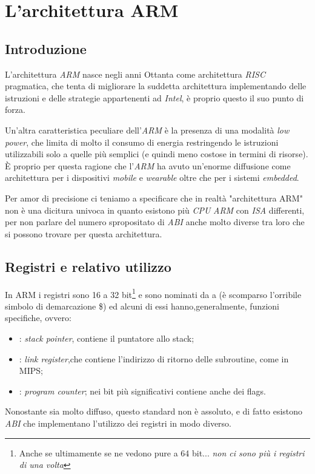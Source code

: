 \documentclass[class=book, crop=false, oneside]{standalone}
\begin{document}
\chapter{L'architettura ARM}

\section{Introduzione}
L'architettura \emph{ARM} nasce negli anni Ottanta come architettura \emph{RISC} pragmatica, che tenta di migliorare la suddetta architettura implementando delle istruzioni e delle strategie appartenenti ad \emph{Intel}, è proprio questo il suo punto di forza.

Un'altra caratteristica peculiare dell'\emph{ARM} è la presenza di una modalità \emph{low power}, che limita di molto il consumo di energia restringendo le istruzioni utilizzabili solo a quelle più semplici (e quindi meno costose in termini di risorse). È proprio per questa ragione che l'\emph{ARM} ha avuto un'enorme diffusione come architettura per i dispositivi \emph{mobile} e \emph{wearable} oltre che per i sistemi \emph{embedded}.

Per amor di precisione ci teniamo a specificare che in realtà "architettura ARM" non è una dicitura univoca in quanto esistono più \emph{CPU} \emph{ARM} con \emph{ISA} differenti, per non parlare del numero spropositato di \emph{ABI} anche molto diverse tra loro che si possono trovare per questa architettura.

\section{Registri e relativo utilizzo}
In ARM i registri sono 16 a 32 bit\footnote{Anche se ultimamente se ne vedono pure a 64 bit... \emph{non ci sono più i registri di una volta}} e sono nominati da  a  (è scomparso l'orribile simbolo di demarcazione \$) ed alcuni di essi hanno,generalmente, funzioni specifiche, ovvero:

\begin{itemize}
	\item {}: \emph{stack pointer}, contiene il puntatore allo stack;
	\item {}: \emph{link register},che contiene l'indirizzo di ritorno delle subroutine, come  in MIPS;
	\item {}: \emph{program counter}; nei bit più significativi contiene anche dei flags.
\end{itemize}
Nonostante sia molto diffuso, questo standard non è assoluto, e di fatto esistono \emph{ABI} che implementano l'utilizzo dei registri in modo diverso.
\end{document}
